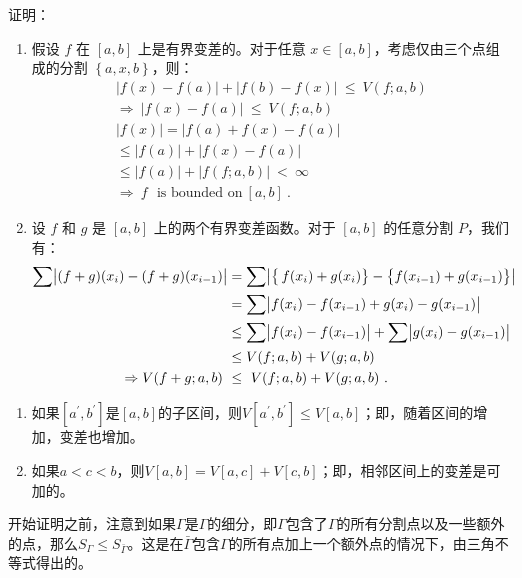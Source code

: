 \begin{example}{证明：}
\begin{enumerate}
\item 假设 $f$ 在 $[a,b]$ 上是有界变差的。对于任意 $x\in[a,b]$，考虑仅由三个点组成的分割 $\left\{a,x,b\right\}$，则：
\begin{align} \left|f(x)-f(a)\right|+\left|f(b)-f(x)\right|\ \leq\ V(f;a,b) \\ \Rightarrow\ \left|f(x)-f(a)\right|\ \leq\ V(f;a,b) \\ \left|f(x)\right|=\left|f(a)+f(x)-f(a)\right| \\ \leq\left|f(a)\right|+\left|f(x)-f(a)\right| \\ \leq\left|f(a)\right|+\left|f(f;a,b)\right|\ <\ \infty \\ \Rightarrow\ f\ \ \ \text{is bounded on}\ [a,b] ~. \end{align}
\item 设 $f$ 和 $g$ 是 $[a,b]$ 上的两个有界变差函数。对于 $[a,b]$ 的任意分割 $P$，我们有：\begin{align} \sum\bigl{|}(f+g)(x_{i})-(f+g)(x_{i-1})\bigr{|}&=\sum\bigl{|}\bigl{\{}\,f(x_{i})+g(x_{i})\bigr{\}}-\bigl{\{}f(x_{i-1})+g(x_{i-1})\bigr{\}}\bigr{|} \\ &=\sum\bigl{|}f(x_{i})-f(x_{i-1})+g(x_{i})-g(x_{i-1})\bigr{|} \\ &\leq\sum\bigl{|}f(x_{i})-f(x_{i-1})\bigr{|}+\sum\bigl{|}g(x_{i})-g(x_{i-1})\bigr{|} \\ &\leq V(f;a,b)+V(g;a,b) \\ \Rightarrow V(f+g;a,b)\ &\leq\ V(f;a,b)+V(g;a,b) ~.\end{align}

\end{enumerate}
\end{example}
\begin{theorem}{}
\begin{enumerate}
\item 如果$[a^{\prime},b^{\prime}]$是$[a,b]$的子区间，则$V[a^{\prime},b^{\prime}]\leq V[a,b]$；即，随着区间的增加，变差也增加。
\item 如果$a<c<b$，则$V[a,b]=V[a,c]+V[c,b]$；即，相邻区间上的变差是可加的。
\end{enumerate}
\end{theorem}
开始证明之前，注意到如果$\Gamma$是$\Gamma$的细分，即$\Gamma$包含了$\Gamma$的所有分割点以及一些额外的点，那么$S_{\Gamma}\leq S_{\bar{\Gamma}}$。这是在$\bar{\Gamma}$包含$\Gamma$的所有点加上一个额外点的情况下，由三角不等式得出的。

